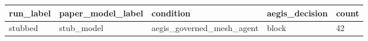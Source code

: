 \begin{tabular}{lllll}
 \hline
run\_label & paper\_model\_label & condition & aegis\_decision & count \\
 \hline
stubbed & stub\_model & aegis\_governed\_mesh\_agent & block & 42 \\
 \hline
\end{tabular}
